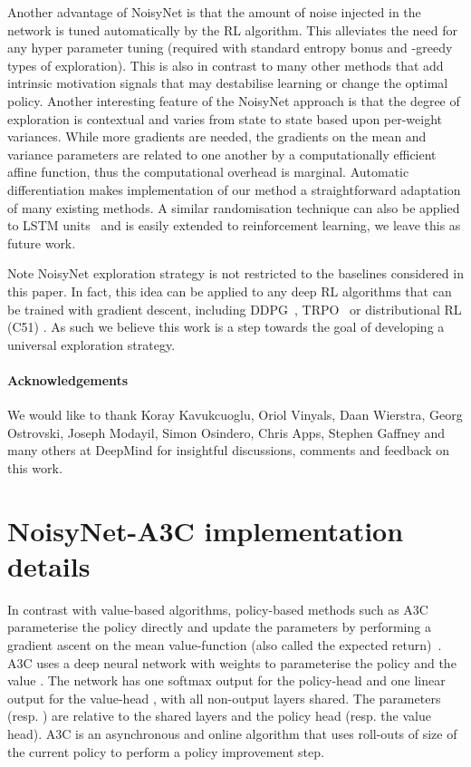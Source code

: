 \documentclass{article}
\newcommand{\algoinit}{NoisyNet}
\begin{document}
Another advantage of NoisyNet is that the amount of noise injected in the network is tuned automatically by the RL algorithm. This alleviates the need for any hyper parameter tuning (required with standard entropy bonus and -greedy types of exploration). 
This is also in contrast to many other methods that add intrinsic motivation signals that may destabilise learning or change the optimal policy. 
Another interesting feature of the \algoinit{} approach is that the degree of exploration is contextual and varies from state to state based upon per-weight variances.
While more gradients are needed, the gradients on the mean and variance parameters are related to one another by a computationally efficient affine function, thus the computational overhead is marginal.
Automatic differentiation makes implementation of our method a straightforward adaptation of many existing methods.
A similar randomisation technique can also be applied to LSTM units~\citep{fortunato2017bayesian} and is easily extended to reinforcement learning, we leave this as future work.

Note \algoinit{} exploration strategy is not restricted to the baselines considered in this paper. In fact, this idea can be applied to any deep RL algorithms that can be trained with gradient descent, including DDPG~\citep{lillicrap2015continuous}, TRPO~\citep{schulman2015trust} or distributional RL (C51) \citep{bellemare2017distributional}. As such we believe this work is a step towards the goal of developing a universal exploration strategy. 

\paragraph{Acknowledgements}
We would like to thank Koray Kavukcuoglu, Oriol Vinyals,  Daan Wierstra, Georg Ostrovski, Joseph Modayil, Simon Osindero, Chris Apps, Stephen Gaffney and many others at DeepMind for insightful discussions, comments and feedback on this work.



\newpage
\appendix

\section{\algoinit{}-A3C implementation details}

 \label{sec:A3Cimplementation}
 In contrast with value-based algorithms, policy-based methods such as A3C~\citep{mnih2016asynchronous} parameterise the policy  directly and update the parameters  by performing a gradient ascent on the mean value-function  (also called the expected return)~\citep{sutton1999policy}. A3C uses a deep neural network  with weights  to parameterise the policy  and the value . The network has one softmax output for the policy-head  and one linear output for the value-head , with all non-output layers shared. The parameters  (resp. ) are relative to the shared layers and the policy head (resp. the value head). A3C is an asynchronous and online algorithm that uses roll-outs of size  of the current policy to perform a policy improvement step. 
\end{document}
